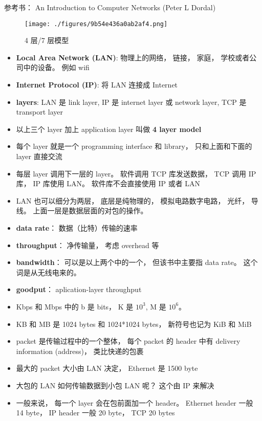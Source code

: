 
\begin{issues}
\issueDraft
\end{issues}

参考书： An Introduction to Computer Networks (Peter L Dordal)

\begin{figure}[ht]
\centering
\texttt{[image: ./figures/9b54e436a0ab2af4.png]}
\caption{4 层/7 层模型} \label{fig_NetNt_1}
\end{figure}

\begin{itemize}
\item \textbf{Local Area Network (LAN)}: 物理上的网络， 链接， 家庭， 学校或者公司中的设备。 例如 wifi
\item \textbf{Internet Protocol (IP)}: 将 LAN 连接成 Internet
\item \textbf{layers}: LAN 是 link layer, IP 是 internet layer 或 network layer, TCP 是 transport layer
\item 以上三个 layer 加上 application layer 叫做 \textbf{4 layer model}
\item 每个 layer 就是一个 programming interface 和 library， 只和上面和下面的 layer 直接交流
\item 每层 layer 调用下一层的 layer。 软件调用 TCP 库发送数据， TCP 调用 IP 库， IP 库使用 LAN。 软件库不会直接使用 IP 或者 LAN
\item LAN 也可以细分为两层， 底层是纯物理的， 模拟电路数字电路， 光纤， 导线。 上面一层是数据层面的对包的操作。
\item \textbf{data rate}： 数据（比特）传输的速率
\item \textbf{throughput}： 净传输量， 考虑 overhead 等
\item \textbf{bandwidth}： 可以是以上两个中的一个， 但该书中主要指 data rate。 这个词是从无线电来的。
\item \textbf{goodput}： aplication-layer throughput
\item Kbps 和 Mbps 中的 b 是 bits， K 是 $10^3$, M 是 $10^6$。
\item KB 和 MB 是 1024 bytes 和 1024*1024 bytes， 新符号也记为 KiB 和 MiB
\item packet 是传输过程中的一个整体， 每个 packet 的 header 中有 delivery information (address)， 类比快递的包裹
\item 最大的 packet 大小由 LAN 决定， Ethernet 是 1500 byte
\item 大包的 LAN 如何传输数据到小包 LAN 呢？ 这个由 IP 来解决
\item 一般来说， 每一个 layer 会在包前面加一个 header。 Ethernet header 一般 14 byte， IP header 一般 20 byte， TCP 20 bytes
\end{itemize}

